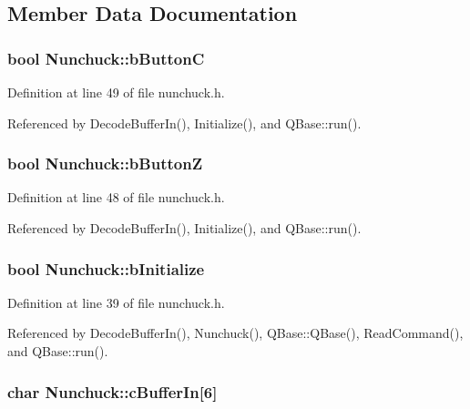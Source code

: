 \subsection{Member Data Documentation}
\hypertarget{classNunchuck_a1d5cac3b603b3060984e3184d795561d}{
\subsubsection[{b\-Button\-C}]{\setlength{\rightskip}{0pt plus 5cm}bool Nunchuck\-::b\-Button\-C}}\label{classNunchuck_a1d5cac3b603b3060984e3184d795561d}


Definition at line 49 of file nunchuck.\-h.



Referenced by Decode\-Buffer\-In(), Initialize(), and Q\-Base\-::run().

\hypertarget{classNunchuck_a0db1f3d2f58fafda23a5af3936c12598}{
\subsubsection[{b\-Button\-Z}]{\setlength{\rightskip}{0pt plus 5cm}bool Nunchuck\-::b\-Button\-Z}}\label{classNunchuck_a0db1f3d2f58fafda23a5af3936c12598}


Definition at line 48 of file nunchuck.\-h.



Referenced by Decode\-Buffer\-In(), Initialize(), and Q\-Base\-::run().

\hypertarget{classNunchuck_a3ecbcb3a01a247605b4f0a37b579581d}{
\subsubsection[{b\-Initialize}]{\setlength{\rightskip}{0pt plus 5cm}bool Nunchuck\-::b\-Initialize}}\label{classNunchuck_a3ecbcb3a01a247605b4f0a37b579581d}


Definition at line 39 of file nunchuck.\-h.



Referenced by Decode\-Buffer\-In(), Nunchuck(), Q\-Base\-::\-Q\-Base(), Read\-Command(), and Q\-Base\-::run().

\hypertarget{classNunchuck_a1bd7122f88582d12ab2ac5d3c8c7b8f8}{
\subsubsection[{c\-Buffer\-In}]{\setlength{\rightskip}{0pt plus 5cm}char Nunchuck\-::c\-Buffer\-In\mbox{[}6\mbox{]}\hspace{0.3cm}{\ttfamily [private]}}}\label{classNunchuck_a1bd7122f88582d12ab2ac5d3c8c7b8f8}



